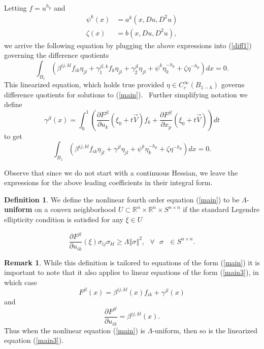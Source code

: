 \documentclass[12pt,leqno]{amsart}%
\theoremstyle{plain}
\numberwithin{equation}{section}
\theoremstyle{definition}
\newtheorem{definition}{Definition}
\newtheorem{remark}{Remark}[section]
\begin{document}
Letting $f=u^{h_{p}}$ and
\begin{align}
\psi^{k}\left(  x\right)   &  =a^{k}(x,Du,D^{2}u)\label{gamma3}\\
\zeta(x)  &  =b(x,Du,D^{2}u), \label{gamma4}%
\end{align}
we arrive the following equation by plugging the above expressions into
(\ref{diff1}) governing the difference quotients
\[
\int_{B_{1}}\left(  \beta^{ij,kl}f_{ik}\eta_{jl}+\gamma_{1}^{jl,k}f_{k}%
\eta_{jl}+\gamma_{2}^{jl}\eta_{jl}+\psi^{k}\eta_{k}^{-h_{p}}+\zeta\eta
^{-h_{p}}\right)  dx=0.
\]
This linearized equation, which holds true provided $\eta\in C_{c}^{\infty
}(B_{1-h})$ governs difference quotients for solutions to (\ref{main}).
\ Further simplifying notation we define
\begin{equation}
\gamma^{jl}(x)=\int_{0}^{1}\left(  \frac{\partial F^{jl}}{\partial u_{k}}%
({\xi_{0}+t\vec{V}})f_{k}+\frac{\partial F^{jl}}{\partial x_{p}}(\xi_{0}%
+t\vec{V})\right)  dt \label{f}%
\end{equation}
to get
\begin{equation}
\int_{B_{1}}\left(  \beta^{ij,kl}f_{ik}\eta_{jl}+\gamma^{jl}\eta_{jl}+\psi
^{k}\eta_{k}^{-h_{p}}+\zeta\eta^{-h_{p}}\right)  dx=0. \label{main3}%
\end{equation}


\medskip Observe that since we do not start with a continuous Hessian, we
leave the expressions for the above leading coefficients in their integral form.

\begin{definition}
We define the nonlinear fourth order equation (\ref{main}) to be $\Lambda
$-\textbf{uniform} on a convex neighborhood $U\subset\mathbb{R}^{n}%
\times\mathbb{R}^{n}\times S^{n\times n}$ if the standard Legendre ellipticity
condition is satisfied for any $\xi\in U $%

\begin{equation}
\frac{\partial F^{jl}}{\partial u_{ik}}(\xi)\sigma_{ij}\sigma_{kl}\geq
\Lambda\left\Vert \sigma\right\Vert ^{2},\text{ $\forall$ }\sigma\text{ $\in
S^{n\times n}$}. \label{Bcondition_1}%
\end{equation}

\end{definition}

\medskip

\begin{remark}
\label{same_lambda}While this definition is tailored to equations of the form
(\ref{main}) it is important to note that it also applies to linear equations
of the form (\ref{main3}), in which case
\[
F^{jl}(x)=\beta^{ij,kl}(x)f_{ik}+\gamma^{jl}(x)
\]
and
\[
\frac{\partial F^{jl}}{\partial u_{ik}}=\beta^{ij,kl}(x).
\]
Thus when the nonlinear equation
(\ref{main}) is $\Lambda$-uniform, then so is the linearized equation
(\ref{main3}).
\end{remark}
\end{document}
